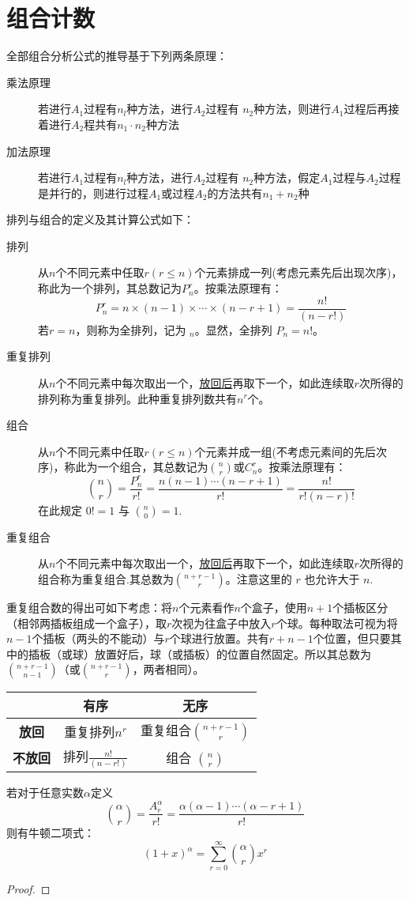 \chapter{组合计数}

全部组合分析公式的推导基于下列两条原理：
\begin{description}
  \item[乘法原理] 若进行$A_1$过程有$n_l$种方法，进行$A_2$过程有 $n_2$种方法，则进行$A_1$过程后再接着进行$A_2$程共有$n_1 \cdot  n_2$种方法
  \item[加法原理] 若进行$A_1$过程有$n_l$种方法，进行$A_2$过程有 $n_2$种方法，假定$A_1$过程与$A_2$过程是并行的，则进行过程$A_1$或过程$A_2$的方法共有$n_1 +n_2$种
\end{description}

排列与组合的定义及其计算公式如下：
\begin{description}
  \item[排列] 从$n$个不同元素中任取$r (r \le n)$个元素排成一列(考虑元素先后出现次序)，称此为一个排列，其总数记为$P_n^r$。按乘法原理有：
    \[ P_n^r = n \times (n - 1) \times \dotsb \times (n - r + 1) = \frac{n!}{(n - r!)} \]
    若$r = n$，则称为全排列，记为 $_n$。显然，全排列 $P_n = n!$。
  \item[重复排列] 从$n$个不同元素中每次取出一个，\underline{放回后}再取下一个，如此连续取$r$次所得的排列称为重复排列。此种重复排列数共有$n^r$个。
  \item[组合] 从$n$个不同元素中任取$r (r \le n)$个元素并成一组(不考虑元素间的先后次序)，称此为一个组合，其总数记为$\binom{n}{r}$或$C_n^r$。按乘法原理有：
    \[ \binom{n}{r} = \frac{P_n^r}{r!} = \frac{n (n - 1) \dotsb (n - r + 1)}{r!} = \frac{n!}{r! (n - r)!} \]
    在此规定 $0! = 1$ 与 $\binom{n}{0} = 1$.
  \item[重复组合] 从$n$个不同元素中每次取出一个，\underline{放回后}再取下一个，如此连续取$r$次所得的组合称为重复组合.其总数为$\binom{n + r - 1}{r}$。注意这里的 $r$ 也允许大于 $n$.
\end{description}

重复组合数的得出可如下考虑：将$n$个元素看作$n$个盒子，使用$n+1$个插板区分（相邻两插板组成一个盒子），取$r$次视为往盒子中放入$r$个球。每种取法可视为将$n-1$个插板（两头的不能动）与$r$个球进行放置。共有$r+n-1$个位置，但只要其中的插板（或球）放置好后，球（或插板）的位置自然固定。所以其总数为$\binom{n + r - 1}{n-1}$（或$\binom{n + r - 1}{r}$，两者相同）。

\begin{table}[h]
  \centering
  \begin{tabular}{|c|c|c|}
    \hline
                     & \bfseries 有序            & \bfseries 无序                 \\ \hline
    \bfseries 放回   & 重复排列$n^r$             & 重复组合$\binom{n + r - 1}{r}$ \\ \hline
    \bfseries 不放回 & 排列$\frac{n!}{(n - r!)}$ & 组合 $\binom{n}{r}$            \\ \hline
  \end{tabular}
\end{table}

\begin{theorem}[牛顿二项式定理]\label{No}
  若对于任意实数$\alpha$定义
  \[ \binom{\alpha}{r}=\frac{A^{\alpha}_{r}}{r!}=\frac{\alpha(\alpha-1)\cdots (\alpha-r+1)}{r!} \]
  则有牛顿二项式：
  \[ (1+x)^{\alpha}=\sum_{r=0}^{\infty}\binom{\alpha}{r}x^r \]
\end{theorem}

\begin{proof}
\end{proof}